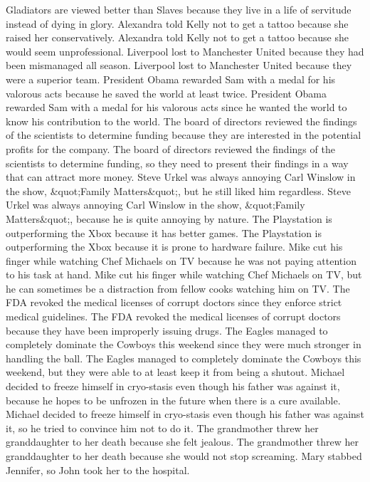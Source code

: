 \documentclass{article}
\begin{document}
\begin{enumerate}
	Gladiators are viewed better than Slaves because they live in a life of servitude instead of dying in glory.
	Alexandra told Kelly not to get a tattoo because she raised her conservatively.
	Alexandra told Kelly not to get a tattoo because she would seem unprofessional.
	Liverpool lost to Manchester United because they had been mismanaged all season.
	Liverpool lost to Manchester United because they were a superior team.
	President Obama rewarded Sam with a medal for his valorous acts because he saved the world at least twice.
	President Obama rewarded Sam with a medal for his valorous acts since he wanted the world to know his contribution to the world.
	The board of directors reviewed the findings of the scientists to determine funding because they are interested in the potential profits for the company.
	The board of directors reviewed the findings of the scientists to determine funding, so they need to present their findings in a way that can attract more money.
	Steve Urkel was always annoying Carl Winslow in the show, &quot;Family Matters&quot;, but he still liked him regardless.
	Steve Urkel was always annoying Carl Winslow in the show, &quot;Family Matters&quot;, because he is quite annoying by nature.
	The Playstation is outperforming the Xbox because it has better games.
	The Playstation is outperforming the Xbox because it is prone to hardware failure.
	Mike cut his finger while watching Chef Michaels on TV because he was not paying attention to his task at hand.
	Mike cut his finger while watching Chef Michaels on TV, but he can sometimes be a distraction from fellow cooks watching him on TV.
	The FDA revoked the medical licenses of corrupt doctors since they enforce strict medical guidelines.
	The FDA revoked the medical licenses of corrupt doctors because they have been improperly issuing drugs.
	The Eagles managed to completely dominate the Cowboys this weekend since they were much stronger in handling the ball.
	The Eagles managed to completely dominate the Cowboys this weekend, but they were able to at least keep it from being a shutout.
	Michael decided to freeze himself in cryo-stasis even though his father was against it, because he hopes to be unfrozen in the future when there is a cure available.
	Michael decided to freeze himself in cryo-stasis even though his father was against it, so he tried to convince him not to do it.
	The grandmother threw her granddaughter to her death because she felt jealous.
	The grandmother threw her granddaughter to her death because she would not stop screaming.
	Mary stabbed Jennifer, so John took her to the hospital.

\end{enumerate}
\end{document}
